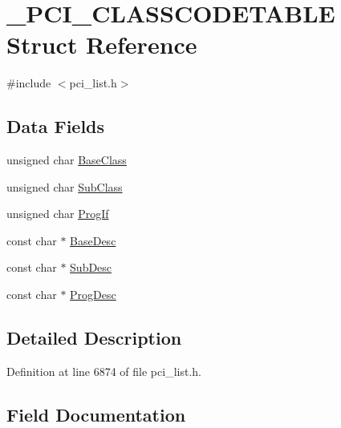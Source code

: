 \hypertarget{struct__PCI__CLASSCODETABLE}{}\section{\+\_\+\+P\+C\+I\+\_\+\+C\+L\+A\+S\+S\+C\+O\+D\+E\+T\+A\+B\+LE Struct Reference}
\label{struct__PCI__CLASSCODETABLE}


{\ttfamily \#include $<$pci\+\_\+list.\+h$>$}

\subsection*{Data Fields}
\begin{DoxyCompactItemize}
\item 
unsigned char \hyperlink{struct__PCI__CLASSCODETABLE_a7a19960d9dbafb954b58363498d7f738}{Base\+Class}
\item 
unsigned char \hyperlink{struct__PCI__CLASSCODETABLE_afefd8246fde2dfbce05dd0bd79f2bf28}{Sub\+Class}
\item 
unsigned char \hyperlink{struct__PCI__CLASSCODETABLE_abc5ea223e3a634dfd00f40c5f3bede92}{Prog\+If}
\item 
const char $\ast$ \hyperlink{struct__PCI__CLASSCODETABLE_a6fd103aa14c2e4206a726ca1e60a0915}{Base\+Desc}
\item 
const char $\ast$ \hyperlink{struct__PCI__CLASSCODETABLE_aeab4f5eb6b728b0401d4a75fd497309c}{Sub\+Desc}
\item 
const char $\ast$ \hyperlink{struct__PCI__CLASSCODETABLE_a06501fb6914742547b7672ab9aaefae3}{Prog\+Desc}
\end{DoxyCompactItemize}


\subsection{Detailed Description}


Definition at line 6874 of file pci\+\_\+list.\+h.



\subsection{Field Documentation}
